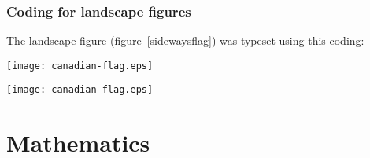 \documentclass{cje}          %
\theoremstyle{plain}%
\theoremstyle{definition}
\theoremstyle{remark}
\begin{document}
\subsubsection{Coding for landscape figures}
\label{landfigures}

The landscape figure (figure~\ref{sidewaysflag}) was typeset using this coding:
\begin{smallverbatim}
\begin{sidewaysfigure}%
\texttt{[image: canadian-flag.eps]}
  \caption{The National Flag of Canada}
\label{sidewaysflag}
\end{sidewaysfigure}
\end{smallverbatim}
\begin{sidewaysfigure}%
\texttt{[image: canadian-flag.eps]}
  \caption{Good artwork can make or break an article}
\label{sidewaysflag}
\end{sidewaysfigure}



\section{Mathematics}
\end{document}
